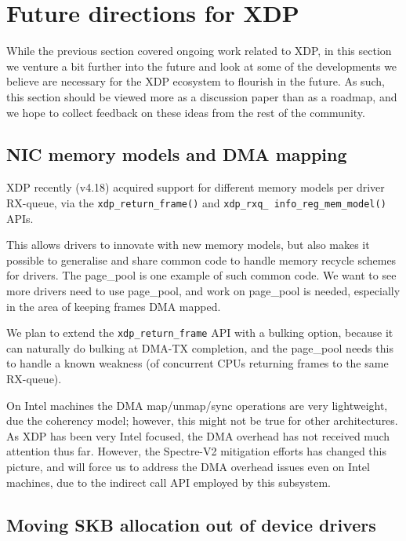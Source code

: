 \documentclass[sigconf]{acmart}
\begin{document}
\section{Future directions for XDP}
\label{sec:future}
While the previous section covered ongoing work related to XDP, in this section
we venture a bit further into the future and look at some of the developments we
believe are necessary for the XDP ecosystem to flourish in the future. As such,
this section should be viewed more as a discussion paper than as a roadmap, and
we hope to collect feedback on these ideas from the rest of the community.

\subsection{NIC memory models and DMA mapping}
\label{sec:nic-memory-models}

XDP recently (v4.18) acquired support for different memory models per driver
RX-queue, via the \texttt{xdp\_return\_frame()} and
\texttt{xdp\_rxq\_ info\_reg\_mem\_model()} APIs.

This allows drivers to innovate with new memory models, but also makes it
possible to generalise and share common code to handle memory recycle schemes
for drivers. The page\_pool is one example of such common code. We want to see
more drivers need to use page\_pool, and work on page\_pool is needed, especially
in the area of keeping frames DMA mapped.

We plan to extend the \texttt{xdp\_return\_frame} API with a bulking option,
because it can naturally do bulking at DMA-TX completion, and the page\_pool
needs this to handle a known weakness (of concurrent CPUs returning frames to
the same RX-queue).

On Intel machines the DMA map/unmap/sync operations are very lightweight, due
the coherency model; however, this might not be true for other architectures. As
XDP has been very Intel focused, the DMA overhead has not received much
attention thus far. However, the Spectre-V2 mitigation efforts has changed this
picture, and will force us to address the DMA overhead issues even on Intel
machines, due to the indirect call API employed by this subsystem.

\subsection{Moving SKB allocation out of device drivers}
\label{sec:moving-skb-alloc}
\end{document}
